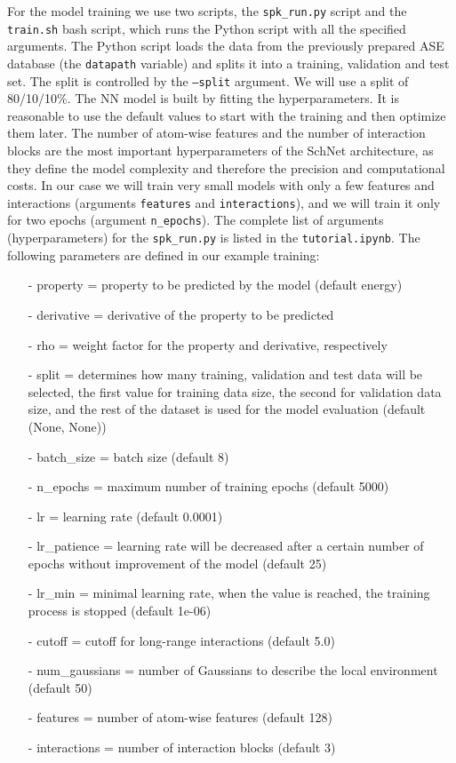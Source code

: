 For the model training we use two scripts, the \texttt{spk\_run.py} script and the \texttt{train.sh} bash script, which runs the Python script with all the specified arguments. The Python script loads the data from the previously prepared ASE database (the \texttt{datapath} variable) and splits it into a training, validation and test set. The split is controlled by the \texttt{--split} argument. We will use a split of 80/10/10\%. The NN model is built by fitting the hyperparameters. It is reasonable to use the default values to start with the training and then optimize them later. The number of atom-wise features and the number of interaction blocks are the most important hyperparameters of the SchNet architecture, as they define the model complexity and therefore the precision and computational costs. In our case we will train very small models with only a few features and interactions (arguments \texttt{features} and \texttt{interactions}), and we will train it only for two epochs (argument \texttt{n\_epochs}). The complete list of arguments (hyperparameters) for the \texttt{spk\_run.py} is listed in the \texttt{tutorial.ipynb}. The following parameters are defined in our example training:
\begin{enumerate}
    \item[-] property = property to be predicted by the model (default energy)
    \item[-] derivative = derivative of the property to be predicted
    \item[-] rho = weight factor for the property and derivative, respectively
    \item[-] split = determines how many training, validation and test data will be selected, the first value for training data size, the second for validation data size, and the rest of the dataset is used for the model evaluation (default (None, None))
    \item[-] batch\_size = batch size (default 8)
    \item[-] n\_epochs = maximum number of training epochs (default 5000)
    \item[-] lr = learning rate (default 0.0001)
    \item[-] lr\_patience = learning rate will be decreased after a certain number of epochs without improvement of the model (default 25)
    \item[-] lr\_min = minimal learning rate, when the value is reached, the training process is stopped (default 1e-06)
    \item[-] cutoff = cutoff for long-range interactions (default 5.0)
    \item[-] num\_gaussians = number of Gaussians to describe the local environment (default 50)
    \item[-] features = number of atom-wise features (default 128)
    \item[-] interactions = number of interaction blocks (default 3)
\end{enumerate}

